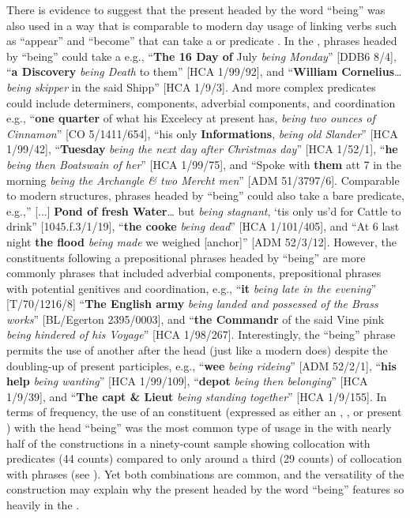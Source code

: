 There is evidence to suggest that the present  headed by the word “being” was also used in a way that is comparable to modern day usage of linking verbs such as “appear” and “become” that can take a  or predicate . In the ,  phrases headed by “being” could take a  e.g., “\textbf{The 16 Day of} July \textit{being Monday}” [DDB6 8/4], “\textbf{a Discovery} \textit{being Death} to them” [HCA 1/99/92], and “\textbf{William Cornelius}…\textit{being skipper} in the said Shipp” [HCA 1/9/3]. And more complex  predicates could include determiners,  components, adverbial components, and coordination e.g., “\textbf{one quarter} of what his Excelecy at present has, \textit{being two ounces of Cinnamon}” [CO 5/1411/654], “his only \textbf{Informations}, \textit{being old Slander}” [HCA 1/99/42], “\textbf{Tuesday} \textit{being the next day after Christmas day}” [HCA 1/52/1], “\textbf{he} \textit{being then Boatswain of her}” [HCA 1/99/75], and “Spoke with \textbf{them} att 7 in the morning \textit{being the Archangle \& two Mercht men}” [ADM 51/3797/6]. Comparable to modern  structures,  phrases headed by “being” could also take a bare  predicate, e.g.,” [...] \textbf{Pond of fresh Water}… but \textit{being stagnant}, ‘tis only us’d for Cattle to drink” [1045.f.3/1/19], “\textbf{the cooke} \textit{being dead}” [HCA 1/101/405], and “At 6 last night \textbf{the flood} \textit{being made} we weighed [anchor]” [ADM 52/3/12]. However, the  constituents following a prepositional phrases headed by “being” are more commonly  phrases that included adverbial components, prepositional phrases with potential genitives and coordination, e.g., “\textbf{it} \textit{being late in the evening}” [T/70/1216/8] “\textbf{The English army} \textit{being landed and possessed of the Brass works}” [BL/Egerton 2395/0003], and “\textbf{the Commandr} of the said Vine pink \textit{being hindered of his Voyage}” [HCA 1/98/267]. Interestingly, the “being” phrase permits the use of another   after the  head (just like a modern  does) despite the doubling-up of present participles, e.g., “\textbf{wee} \textit{being rideing}” [ADM 52/2/1], “\textbf{his help} \textit{being wanting}” [HCA 1/99/109], “\textbf{depot} \textit{being then belonging}” [HCA 1/9/39], and “\textbf{The capt \& Lieut} \textit{being standing together}” [HCA 1/9/155]. In terms of frequency, the use of an  constituent (expressed as either an , , or present ) with the  head “being” was the most common type of usage in the  with nearly half of the constructions in a ninety-count sample showing collocation with  predicates (44 counts) compared to only around a third (29 counts) of collocation with  phrases (see ). Yet both combinations are common, and the versatility of the construction may explain why the present  headed by the word “being” features so heavily in the . 

